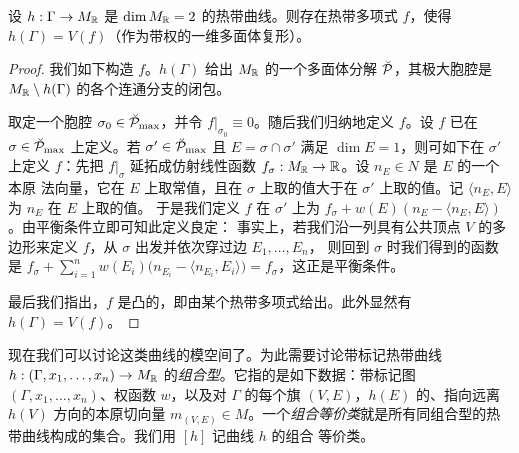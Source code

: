 
\begin{proposition}
设 $h : \Gamma \to M_{\mathbb{R}}$ 是 $\dim M_{\mathbb{R}} = 2$ 的热带曲线。则存在热带多项式 $f$，使得
$h(\Gamma) = V(f)$（作为带权的一维多面体复形）。
\end{proposition}

\begin{proof}
我们如下构造 $f$。$h(\Gamma)$ 给出 $M_{\mathbb{R}}$ 的一个多面体分解 $\breve{\mathcal{P}}$，其极大胞腔是
$M_{\mathbb{R}} \setminus h(\Gamma)$ 的各个连通分支的闭包。

取定一个胞腔 $\sigma_0 \in \breve{\mathcal{P}}_{\max}$，并令 $f|_{\sigma_0} \equiv 0$。随后我们归纳地定义 $f$。设 $f$ 已在
$\sigma \in \breve{\mathcal{P}}_{\max}$ 上定义。若 $\sigma' \in \breve{\mathcal{P}}_{\max}$ 且 $E = \sigma \cap \sigma'$ 满足 $\dim E = 1$，则可如下在
$\sigma'$ 上定义 $f$：先把 $f|_\sigma$ 延拓成仿射线性函数 $f_\sigma : M_{\mathbb{R}} \to \mathbb{R}$。设 $n_E \in N$ 是 $E$ 的一个本原
法向量，它在 $E$ 上取常值，且在 $\sigma$ 上取的值大于在 $\sigma'$ 上取的值。记 $\langle n_E, E\rangle$ 为 $n_E$ 在 $E$ 上取的值。
于是我们定义 $f$ 在 $\sigma'$ 上为 $f_\sigma + w(E)(n_E - \langle n_E, E\rangle)$。由平衡条件立即可知此定义良定：
事实上，若我们沿一列具有公共顶点 $V$ 的多边形来定义 $f$，从 $\sigma$ 出发并依次穿过边 $E_1,\dots,E_n$，
则回到 $\sigma$ 时我们得到的函数是
$f_\sigma + \sum_{i=1}^n w(E_i)\bigl(n_{E_i} - \langle n_{E_i}, E_i\rangle\bigr) = f_\sigma$，这正是平衡条件。

最后我们指出，$f$ 是凸的，即由某个热带多项式给出。此外显然有 $h(\Gamma) = V(f)$。
\end{proof}


现在我们可以讨论这类曲线的模空间了。为此需要讨论带标记热带曲线
$h : (\Gamma, x_1,\dots,x_n) \to M_{\mathbb{R}}$ 的\emph{组合型}。它指的是如下数据：带标记图
$(\Gamma,x_1,\dots,x_n)$、权函数 $w$，以及对 $\Gamma$ 的每个旗 $(V,E)$，$h(E)$ 的、指向远离 $h(V)$ 方向的本原切向量
$m_{(V,E)} \in M$。一个\emph{组合等价类}就是所有同组合型的热带曲线构成的集合。我们用 $[h]$ 记曲线 $h$ 的组合
等价类。

